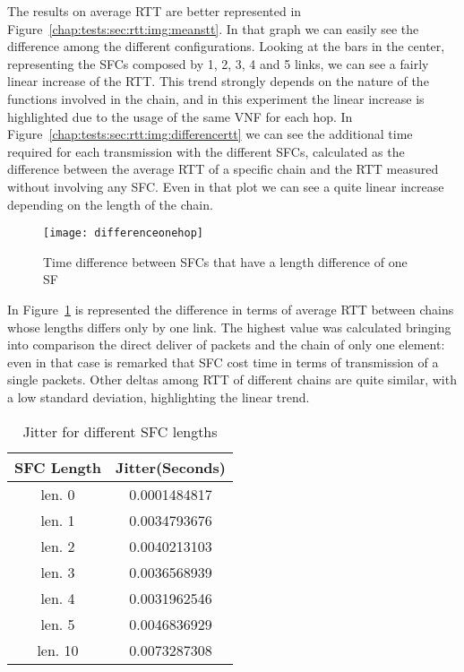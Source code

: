 \noindent
The results on average RTT are better represented in
Figure~\ref{chap:tests:sec:rtt:img:meanstt}. In that graph we can easily see
the difference among the different configurations. Looking at the bars in the
center, representing the SFCs composed by 1, 2, 3, 4 and 5 links, we can see a
fairly linear increase of the RTT. This trend strongly depends on the nature of
the functions involved in the chain, and in this experiment the linear increase
is highlighted due to the usage of the same VNF for each hop. In
Figure~\ref{chap:tests:sec:rtt:img:differencertt} we can see the additional
time required for each transmission with the different SFCs, calculated as the
difference between the average RTT of a specific chain and the RTT measured
without involving any SFC. Even in that plot we can see a quite linear
increase depending on the length of the chain.

\begin{figure}[H]
  \centering
  \texttt{[image: differenceonehop]}
  \caption{Time difference between SFCs that have a length difference of one SF}
  \label{chap:tests:sec:rtt:img:differenceonehop}
\end{figure}

\noindent
In Figure~\ref{chap:tests:sec:rtt:img:differenceonehop} is represented the
difference in terms of average RTT between chains whose lengths differs only by
one link. The highest value was calculated bringing into comparison the direct
deliver of packets and the chain of only one element: even in that case is
remarked that SFC cost time in terms of transmission of a single packets.
Other deltas among RTT of different chains are quite similar, with a low
standard deviation, highlighting the linear trend.

\begin{table}[H]
\centering
\begin{tabular}{@{}cc@{}}
\toprule
\textbf{SFC Length} & \textbf{Jitter(Seconds)} \\ \midrule
len. 0    & 0.0001484817    \\
len. 1    & 0.0034793676    \\
len. 2    & 0.0040213103    \\
len. 3    & 0.0036568939    \\
len. 4    & 0.0031962546    \\
len. 5    & 0.0046836929    \\
len. 10   & 0.0073287308    \\ \bottomrule
\end{tabular}
\caption{Jitter for different SFC lengths}
\label{chap:tests:sec:rtt:tab:jitter}
\end{table}

